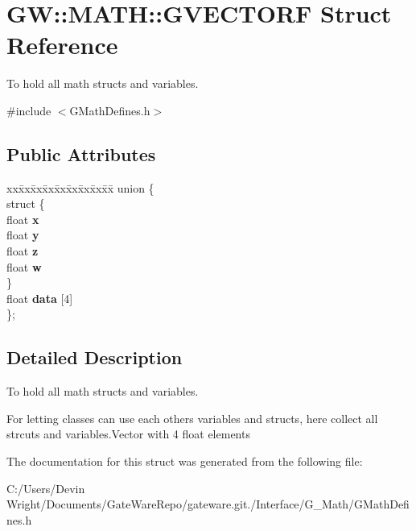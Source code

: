 \hypertarget{struct_g_w_1_1_m_a_t_h_1_1_g_v_e_c_t_o_r_f}{}\section{GW\+:\+:M\+A\+TH\+:\+:G\+V\+E\+C\+T\+O\+RF Struct Reference}
\label{struct_g_w_1_1_m_a_t_h_1_1_g_v_e_c_t_o_r_f}


To hold all math structs and variables.  




{\ttfamily \#include $<$G\+Math\+Defines.\+h$>$}

\subsection*{Public Attributes}
\begin{DoxyCompactItemize}
\item 
\mbox{\label{struct_g_w_1_1_m_a_t_h_1_1_g_v_e_c_t_o_r_f_a38acd9d2b655a4357b2430d20e50f31e}} 
\begin{tabbing}
xx\=xx\=xx\=xx\=xx\=xx\=xx\=xx\=xx\=\kill
union \{\\
\mbox{\label{union_g_w_1_1_m_a_t_h_1_1_g_v_e_c_t_o_r_f_1_1_0D4_a8671179b6484d5fa64dc13ba474fa3a8}} 
\>struct \{\\
\>\>float {\bfseries x}\\
\>\>float {\bfseries y}\\
\>\>float {\bfseries z}\\
\>\>float {\bfseries w}\\
\>\} \\
\>float {\bfseries data} \mbox{[}4\mbox{]}\\
\}; \\

\end{tabbing}\end{DoxyCompactItemize}


\subsection{Detailed Description}
To hold all math structs and variables. 

For letting classes can use each others variables and structs, here collect all strcuts and variables.\+Vector with 4 float elements 

The documentation for this struct was generated from the following file\+:\begin{DoxyCompactItemize}
\item 
C\+:/\+Users/\+Devin Wright/\+Documents/\+Gate\+Ware\+Repo/gateware.\+git./\+Interface/\+G\+\_\+\+Math/G\+Math\+Defines.\+h\end{DoxyCompactItemize}
